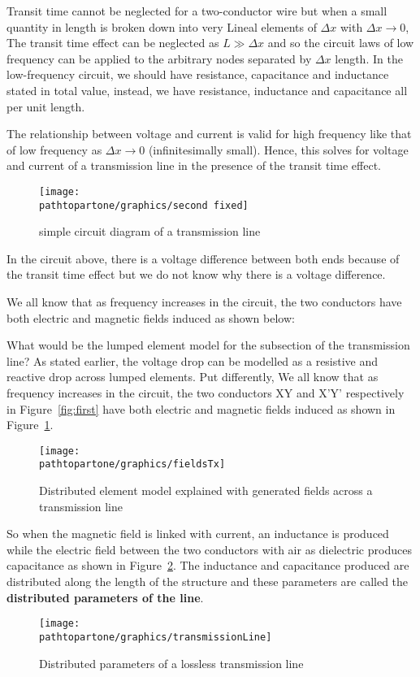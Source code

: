Transit time cannot be neglected for a two-conductor wire but when a small quantity in length is broken down into very Lineal elements of $ \Delta x $ with  $  \Delta x \rightarrow 0 $, The transit time effect can be neglected as $ L \gg \Delta x $ and so the circuit laws of low frequency can be applied to the arbitrary nodes separated by $ \Delta x $ length. In the low-frequency circuit, we should have resistance, capacitance and inductance stated in total value, instead, we have resistance, inductance and capacitance all per unit length.

The relationship between voltage and current is valid for high frequency like that of low frequency as $ \Delta x  \rightarrow 0$ (infinitesimally small). Hence, this solves for voltage and current of a transmission line in the presence of the transit time effect.
\begin{figure}[h]
\centering
\texttt{[image: \\pathtopartone/graphics/second fixed]}
\caption{simple circuit diagram of a transmission line}
\end{figure}	

In the circuit above, there is a voltage difference between both ends because of the transit time effect but we do not know why there is a voltage difference.

We all know that as frequency increases in the circuit, the two conductors have both electric and magnetic fields induced as shown below: 

What would be the lumped element model for the subsection of the transmission line? As stated earlier, the voltage drop can be modelled as a resistive and reactive drop across lumped elements. Put differently, We all know that as frequency increases in the circuit, the two conductors XY and X'Y' respectively in Figure~\ref{fig:first} have both electric and magnetic fields induced as shown in Figure~\ref{fig:third}.
\begin{figure}[h]
\centering
\texttt{[image: \\pathtopartone/graphics/fieldsTx]}
\caption{Distributed element model explained with generated fields across a transmission line}
\label{fig:third}
\end{figure}

So when the magnetic field is linked with current, an inductance is produced while the electric field between the two conductors with air as dielectric produces capacitance as shown in Figure~\ref{fig:lossless-Tx}. The inductance and capacitance produced are distributed along the length of the structure and these parameters are called the \textbf{distributed parameters of the line}.
\begin{figure}[h]
\centering
\texttt{[image: \\pathtopartone/graphics/transmissionLine]}
\caption{Distributed parameters of a lossless transmission line}
\label{fig:lossless-Tx}
\end{figure}

